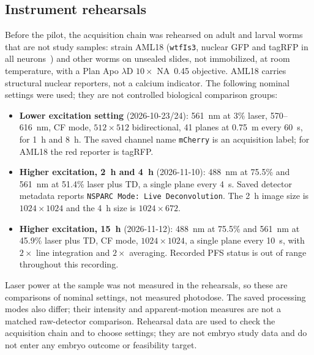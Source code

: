 \documentclass[11pt]{article}
\begin{document}
\subsection{Instrument rehearsals}\label{sec:rehearsal}
Before the pilot, the acquisition chain was rehearsed on adult and larval worms that
are not study samples: strain AML18 (\texttt{wtfIs3}, nuclear GFP and tagRFP in all
neurons~\cite{aml18}) and other worms on unsealed slides, not immobilized, at room
temperature, with a Plan Apo $\lambda$D $10\times$ NA~0.45 objective. AML18 carries
structural nuclear reporters, not a calcium indicator. The following nominal
settings were used; they are not controlled biological comparison groups:
\begin{itemize}
  \item \textbf{Lower excitation setting} (2026-10-23/24): 561~nm at 3\% laser,
        570--616~nm, CF mode,
        $512\times512$ bidirectional, 41 planes at 0.75~\textmu m every 60~s, for 1~h
        and 8~h. The saved channel name \texttt{mCherry} is an acquisition label;
        for AML18 the red reporter is tagRFP.
  \item \textbf{Higher excitation, 2~h and 4~h} (2026-11-10): 488~nm at 75.5\% and
        561~nm at 51.4\% laser plus TD, a single plane every 4~s. Saved detector
        metadata reports \texttt{NSPARC Mode: Live Deconvolution}. The 2~h image
        size is $1024\times1024$ and the 4~h size is $1024\times672$.
  \item \textbf{Higher excitation, 15~h} (2026-11-12): 488~nm at 75.5\% and 561~nm
        at 45.9\% laser plus TD, CF mode, $1024\times1024$, a single plane every
        10~s, with $2\times$ line integration and $2\times$ averaging. Recorded PFS
        status is out of range throughout this recording.
\end{itemize}
Laser power at the sample was not measured in the rehearsals, so these are
comparisons of nominal settings, not measured photodose. The saved processing
modes also differ; their intensity and apparent-motion measures are not a matched
raw-detector comparison. Rehearsal data are used to check the acquisition chain
and to choose settings; they are not embryo study data and do not enter any
embryo outcome or feasibility target.
\end{document}
